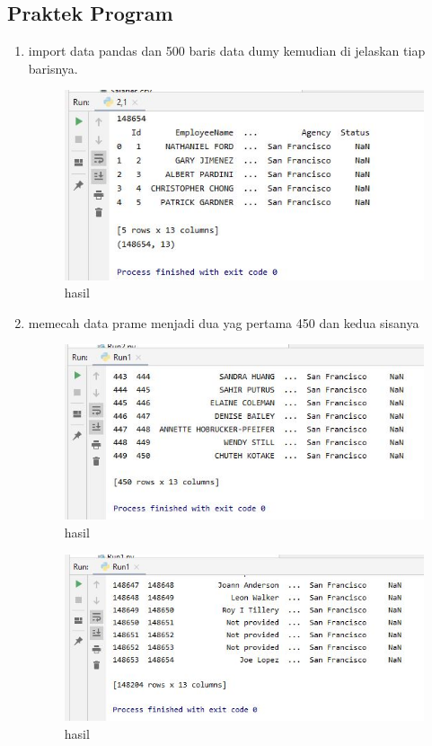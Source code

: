 \subsection{Praktek Program}
\begin{enumerate}
\item import data pandas dan 500 baris data dumy kemudian di jelaskan tiap barisnya.

\begin{figure}[ht]
\centering
\includegraphics[scale=0.5]{figures/1174042/chapter4/2,1.JPG}
\caption{hasil}
\label{Praktek no 1}
\end{figure}

\item memecah data prame menjadi dua yag pertama 450 dan kedua sisanya

\begin{figure}[ht]
\centering
\includegraphics[scale=0.5]{figures/1174042/chapter4/2,2.JPG}
\caption{hasil}
\label{Praktek no 2}
\end{figure}

\begin{figure}[ht]
\centering
\includegraphics[scale=0.5]{figures/1174042/chapter4/2,2,1.JPG}
\caption{hasil}
\label{Praktek no 2}
\end{figure}


\end{enumerate}
